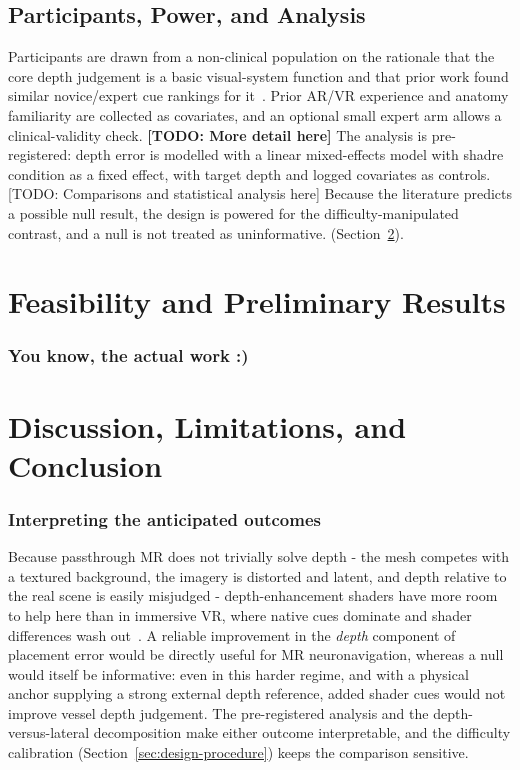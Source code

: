 \documentclass[runningheads]{llncs}
\begin{document}
\subsection{Participants, Power, and Analysis}\label{sec:design-analysis}
Participants are drawn from a non-clinical population on the rationale that the core depth judgement is a basic visual-system function and that prior work found similar novice/expert cue rankings for it~\cite{kersten-oertel_evaluation_2014}. Prior AR/VR experience and anatomy familiarity are collected as covariates, and an optional small expert arm allows a clinical-validity check. \textbf{[TODO: More detail here]} The analysis is pre-registered: depth error is modelled with a linear mixed-effects model with shadre condition as a fixed effect, with target depth and logged covariates as controls. [TODO: Comparisons and statistical analysis here] Because the literature predicts a possible null result, the design is powered for the difficulty-manipulated contrast, and a null is not treated as uninformative. (Section~\ref{sec:discussion}).

\section{Feasibility and Preliminary Results}\label{sec:results}

\subsubsection{You know, the actual work :)}


\section{Discussion, Limitations, and Conclusion}\label{sec:discussion}

\subsubsection{Interpreting the anticipated outcomes}
Because passthrough MR does not trivially solve depth - the mesh competes with a textured background, the imagery is distorted and latent, and depth relative to the real scene is easily misjudged - depth-enhancement shaders have more room to help here than in immersive VR, where native cues dominate and shader differences wash out~\cite{heinrich_estimating_2021,titov_effect_2021}. A reliable improvement in the \emph{depth} component of placement error would be directly useful for MR neuronavigation, whereas a null would itself be informative: even in this harder regime, and with a physical anchor supplying a strong external depth reference, added shader cues would not improve vessel depth judgement. The pre-registered analysis and the depth-versus-lateral decomposition make either outcome interpretable, and the difficulty calibration (Section~\ref{sec:design-procedure}) keeps the comparison sensitive.
\end{document}
